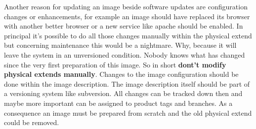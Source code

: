 Another reason for updating an image beside software updates are
configuration changes or enhancements, for example an image should
have replaced its browser with another better browser or a new service
like apache should be enabled. In principal it's possible to do all
those changes manually within the physical extend but concerning
maintenance this would be a nightmare. Why, because it will leave the
system in an unversioned condition. Nobody knows what has changed
since the very first preparation of this image. So in short
\textbf{dont't modify physical extends manually}. Changes to the image
configuration should be done within the image description. The
image description itself should be part of a versioning system like
subversion. All changes can be tracked down then and maybe more
important can be assigned to product tags and branches. As a consequence
an image must be prepared from scratch and the old physical extend
could be removed.
